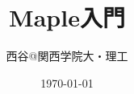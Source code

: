 \documentclass[10pt,a4j]{jbook}
\begin{document}
\title{Maple入門}
\author{西谷@関西学院大・理工}
\date{\today}
\maketitle
\tableofcontents


\end{document}
